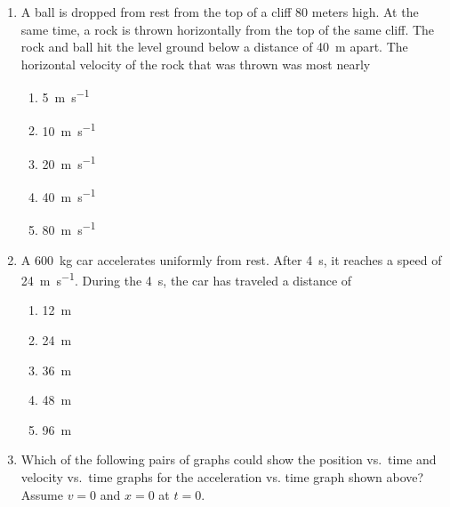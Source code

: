 \documentclass{../../../oss-apphys}
\begin{document}
\begin{multicols}{2}
\begin{enumerate}[resume,leftmargin=18pt]
  \item A ball is dropped from rest from the top of a cliff $80$ meters high. At
    the same time, a rock is thrown horizontally from the top of the same
    cliff. The rock and ball hit the level ground below a distance of
    \SI{40}{\metre} apart. The horizontal velocity of the rock that was thrown
    was most nearly
    \begin{center}
      \vspace{-.15in}
    \end{center}
    \begin{enumerate}[nosep,leftmargin=18pt,label=(\Alph*)]
    \item\SI{5}{\metre\per\second}
    \item\SI{10}{\metre\per\second}
    \item\SI{20}{\metre\per\second}
    \item\SI{40}{\metre\per\second}
    \item\SI{80}{\metre\per\second}
    \end{enumerate}

  \item A \SI{600}{\kilo\gram} car accelerates uniformly from rest. After
    \SI{4}{\second}, it reaches a speed of \SI{24}{\metre\per\second}. During
    the \SI{4}{\second}, the car has traveled a distance of
    \begin{enumerate}[nosep,leftmargin=18pt,label=(\Alph*)]
    \item\SI{12}{\metre}
    \item\SI{24}{\metre}
    \item\SI{36}{\metre}
    \item\SI{48}{\metre}
    \item\SI{96}{\metre}
    \end{enumerate}
    \columnbreak
    
  \item Which of the following pairs of graphs could show the position vs.\
    time and velocity vs.\ time graphs for the acceleration vs. time graph
    shown above? Assume $v=0$ and $x=0$ at $t=0$.
    \begin{center}
    \end{center}
    \columnbreak
    

\end{enumerate}
\end{multicols}
\end{document}
